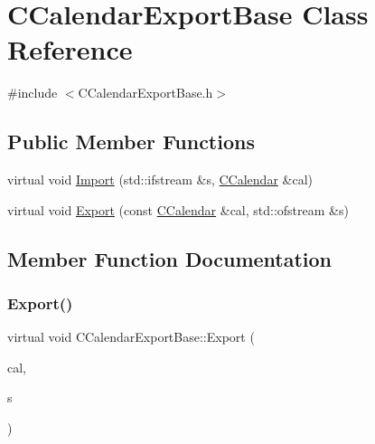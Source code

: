 \hypertarget{class_c_calendar_export_base}{}\section{C\+Calendar\+Export\+Base Class Reference}
\label{class_c_calendar_export_base}


{\ttfamily \#include $<$C\+Calendar\+Export\+Base.\+h$>$}

\subsection*{Public Member Functions}
\begin{DoxyCompactItemize}
\item 
virtual void \mbox{\hyperlink{class_c_calendar_export_base_a68f559236ae80f4110d924b03fb9be4f}{Import}} (std\+::ifstream \&s, \mbox{\hyperlink{class_c_calendar}{C\+Calendar}} \&cal)
\item 
virtual void \mbox{\hyperlink{class_c_calendar_export_base_a297c806becdefe3de831b05f30763bb3}{Export}} (const \mbox{\hyperlink{class_c_calendar}{C\+Calendar}} \&cal, std\+::ofstream \&s)
\end{DoxyCompactItemize}


\subsection{Member Function Documentation}
\mbox{\label{class_c_calendar_export_base_a297c806becdefe3de831b05f30763bb3}} 
\subsubsection{\texorpdfstring{Export()}{Export()}}
{\footnotesize\ttfamily virtual void C\+Calendar\+Export\+Base\+::\+Export (\begin{DoxyParamCaption}\item[{const \mbox{\hyperlink{class_c_calendar}{C\+Calendar}} \&}]{cal,  }\item[{std\+::ofstream \&}]{s }\end{DoxyParamCaption})\hspace{0.3cm}{\ttfamily [virtual]}}

\mbox{\label{class_c_calendar_export_base_a68f559236ae80f4110d924b03fb9be4f}} 
